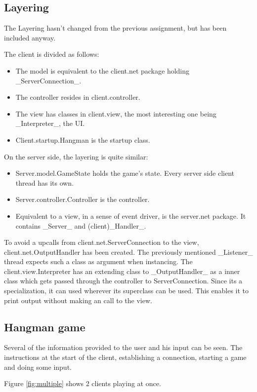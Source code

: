 \documentclass[a4paper]{scrartcl}
\begin{document}
\subsection{Layering}
The Layering hasn't changed from the previous assignment, but has been included anyway.

The client is divided as follows:
\begin{itemize}
    \item The model is equivalent to the client.net package holding _ServerConnection_.
    \item The controller resides in client.controller.
    \item The view has classes in client.view, the most interesting one being _Interpreter_, the UI.
    \item Client.startup.Hangman is the startup class.
\end{itemize}

On the server side, the layering is quite similar:
\begin{itemize}
    \item Server.model.GameState holds the game's state. Every server side client thread has its own.
    \item Server.controller.Controller is the controller.
    \item Equivalent to a view, in a sense of event driver, is the server.net package.
    It contains _Server_ and (client)_Handler_.
\end{itemize}

To avoid a upcalls from client.net.ServerConnection to the view, client.net.OutputHandler has been created.
The previously mentioned _Listener_ thread expects such a class as argument when instancing.
The client.view.Interpreter has an extending class to _OutputHandler_ as a inner class which gets passed through the controller to ServerConnection.
Since its a specialization, it can used wherever its superclass can be used.
This enables it to print output without making an call to the view.

\subsection{Hangman game}
Several of the information provided to the user and his input can be seen.
The instructions at the start of the client, establishing a connection, starting a game and doing some input.

Figure \ref{fig:multiple} shows 2 clients playing at once.
\end{document}
